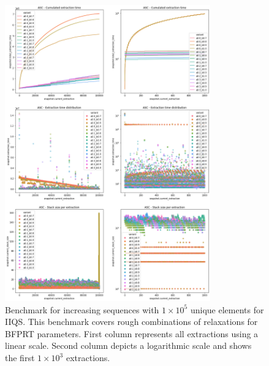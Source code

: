 \begin{figure}[!ht]
    \centering
    \includegraphics[width=0.79\textwidth]{./fragments/04_experimental_execution/images/04_alphabeta_detail_increasing.png}
    \caption{Benchmark for increasing sequences with $1\times10^5$ unique elements for IIQS. This benchmark covers rough combinations of relaxations for BFPRT parameters. First column represents all extractions using a linear scale. Second column depicts a logarithmic scale and shows the first $1\times10^3$ extractions. }
    \label{FIG:05_ALPHABETA_BENCHMARK_ASC}
\end{figure}

